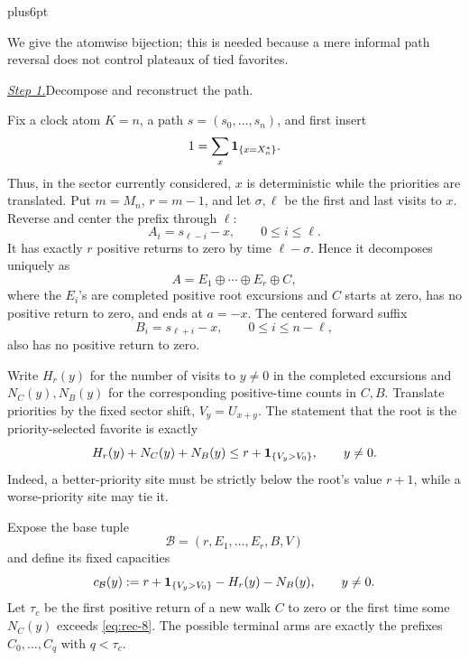 \documentclass[12pt,reqno]{amsart}
\makeatletter
\theoremstyle{plain}
\theoremstyle{definition}
\theoremstyle{remark}
\renewenvironment{proof}[1][\proofname]{%
  \par
  \pushQED{\qed}%
  \normalfont
  \topsep6pt plus6pt\relax
  \trivlist
  \item[\hskip\labelsep\slshape #1\@addpunct{.}]%
  \ignorespaces
}{%
  \popQED
  \endtrivlist
  \@endpefalse
}
\DeclareRobustCommand{\qed}{%
  \leavevmode\unskip\penalty9999\hbox{}\nobreak
  \ifmmode
    \makebox[0pt][l]{\qquad\hbox{\qedsymbol}}%
  \else
    \qquad\hbox{\qedsymbol}%
  \fi
}
\renewcommand{\qedsymbol}{\rule[.47pt]{4pt}{6pt}}
\numberwithin{equation}{section}
\makeatother
\begin{document}
\begin{proof}
We give the atomwise bijection; this is needed because a mere informal path
reversal does not control plateaux of tied favorites.

\smallskip\noindent\underline{\textit{Step 1.}}\quad Decompose and reconstruct the path.

Fix a clock atom \(K=n\), a path
\(s=(s_0,\ldots,s_n)\), and first insert
\[
       1=\sum_x{\bf1}_{\{x=X_n^*\}}.
\]
Thus, in the sector currently considered, \(x\) is deterministic while the
priorities are translated.  Put \(m=M_n\), \(r=m-1\), and let
\(\sigma,\ell\) be the first and last visits to \(x\).  Reverse and center
the prefix through \(\ell\):
\[
       A_i=s_{\ell-i}-x,\qquad 0\le i\le\ell.
\]
It has exactly \(r\) positive returns to zero by time
\(\ell-\sigma\).  Hence it decomposes uniquely as
\begin{equation}
A=E_1\oplus\cdots\oplus E_r\oplus C,                    \label{eq:rec-6}
\end{equation}
where the \(E_i\)'s are completed positive root excursions and \(C\)
starts at zero, has no positive return to zero, and ends at
\(a=-x\).  The centered forward suffix
\[
       B_i=s_{\ell+i}-x,\qquad 0\le i\le n-\ell,
\]
also has no positive return to zero.

Write \(H_r(y)\) for the number of visits to \(y\ne0\) in the completed
excursions and \(N_C(y),N_B(y)\) for the corresponding positive-time
counts in \(C,B\).  Translate priorities by the fixed sector shift,
\(V_y=U_{x+y}\).  The statement that the root is the priority-selected
favorite is exactly
\begin{equation}
H_r(y)+N_C(y)+N_B(y)
       \le r+{\bf1}_{\{V_y>V_0\}},\qquad y\ne0.                 \label{eq:rec-7}
\end{equation}
Indeed, a better-priority site must be strictly below the root's value
\(r+1\), while a worse-priority site may tie it.

Expose the base tuple
\[
       \mathcal{B}=(r,E_1,\ldots,E_r,B,V)
\]
and define its fixed capacities
\begin{equation}
c_\mathcal{B}(y):=
       r+{\bf1}_{\{V_y>V_0\}}-H_r(y)-N_B(y),\qquad y\ne0.       \label{eq:rec-8}
\end{equation}
Let \(\tau_c\) be the first positive return of a new walk \(C\) to zero or
the first time some \(N_C(y)\) exceeds \eqref{eq:rec-8}.  The possible terminal arms
are exactly the prefixes \(C_0,\ldots,C_q\) with \(q<\tau_c\).


\end{proof}
\end{document}
